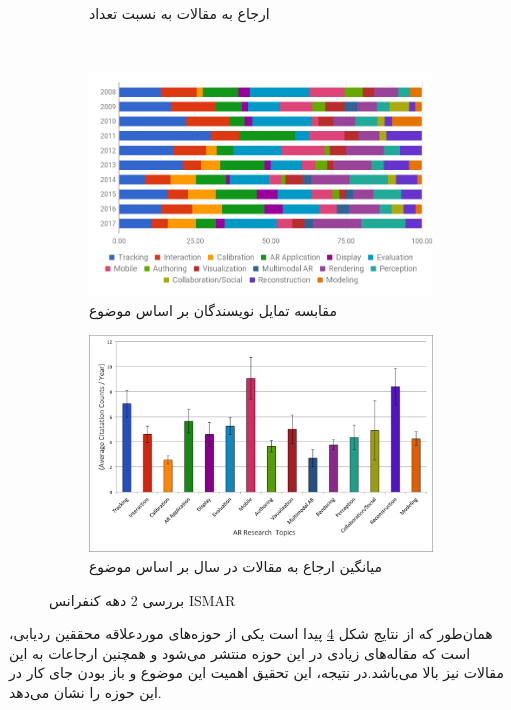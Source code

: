 \begin{figure}
\begin{subfigure}[b]{0.4\textwidth}
		\caption{ارجاع به مقالات به نسبت تعداد}
		\label{fig:tiger}
	\end{subfigure}
	~ %
	\begin{subfigure}[b]{0.5\textwidth}
		\includegraphics[width=\textwidth]{image/ismar3}
		\caption{مقابسه تمایل نویسندگان بر اساس موضوع}
		\label{fig:tiger}
	\end{subfigure}
\begin{subfigure}[b]{0.5\textwidth}
	\includegraphics[width=\textwidth]{image/ismar4}
	\caption{میانگین ارجاع به مقالات در سال بر اساس موضوع}
	\label{fig:tiger}
\end{subfigure}
	\caption{بررسی 2 دهه کنفرانس ISMAR\cite{ismar}}\label{fig:ISMAR}
\end{figure}

 همان‌طور که از نتایج شکل \ref{fig:ISMAR} پیدا است یکی از حوزه‌های موردعلاقه محققین ردیابی، است که مقاله‌های زیادی در این حوزه منتشر می‌شود و همچنین ارجاعات به این مقالات نیز بالا می‌باشد.در نتیجه، این تحقیق اهمیت این موضوع و باز بودن جای کار در این حوزه را نشان می‌دهد.



